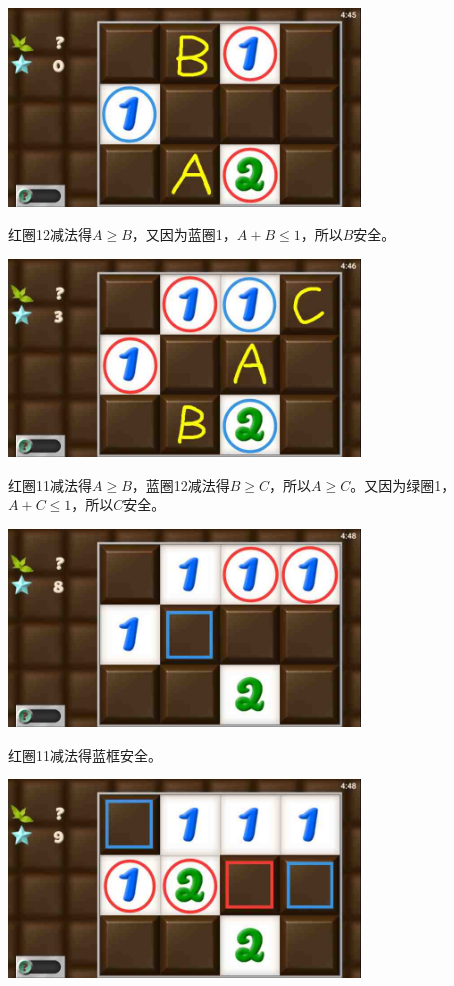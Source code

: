 \subsection{} %
\begin{center}
    \includegraphics[width=0.7\textwidth]{puzzlelow/72-1.jpg}
\end{center}
红圈12减法得$A\ge B$，又因为蓝圈1，$A+B\le 1$，所以$B$安全。
\begin{center}
    \includegraphics[width=0.7\textwidth]{puzzlelow/72-2.jpg}
\end{center}
红圈11减法得$A\ge B$，蓝圈12减法得$B\ge C$，所以$A\ge C$。又因为绿圈1，$A+C\le 1$，所以$C$安全。
\begin{center}
    \includegraphics[width=0.7\textwidth]{puzzlelow/72-3.jpg}
\end{center}
红圈11减法得蓝框安全。
\begin{center}
    \includegraphics[width=0.7\textwidth]{puzzlelow/72-4.jpg}
\end{center}
